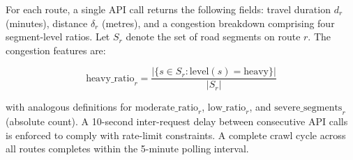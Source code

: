   For each route, a single API call returns the following fields: travel                                                                                  
  duration $d_r$ (minutes), distance $\delta_r$ (metres), and a congestion                                                                                
  breakdown comprising four segment-level ratios. Let $S_r$ denote the set                                                                                
  of road segments on route $r$. The congestion features are:                                                                                             
                                                                                                                                                          
  \begin{equation}                                                                                                                                        
  \label{eq:heavy_ratio}                                                                                                                                  
  \text{heavy\_ratio}_r = \frac{|\{s \in S_r : \text{level}(s) = \text{heavy}\}|}{|S_r|}
  \end{equation}                                                                                                                                          
   
  with analogous definitions for $\text{moderate\_ratio}_r$,                                                                                              
  $\text{low\_ratio}_r$, and $\text{severe\_segments}_r$ (absolute count).
  A 10-second inter-request delay between consecutive API calls is enforced                                                                               
  to comply with rate-limit constraints. A complete crawl cycle across all                                                                                
  routes completes within the 5-minute polling interval.                                                                                               
                                                                                                                                                          
